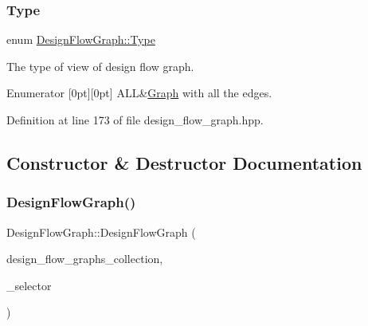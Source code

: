 \subsubsection{\texorpdfstring{Type}{Type}}
{\footnotesize\ttfamily enum \hyperlink{classDesignFlowGraph_ab90f4a312dc3eaa9d6df290bb9b2848b}{Design\+Flow\+Graph\+::\+Type}}



The type of view of design flow graph. 

\begin{DoxyEnumFields}{Enumerator}
[0pt][0pt]{}\mbox{\label{classDesignFlowGraph_ab90f4a312dc3eaa9d6df290bb9b2848bae151085d475a6fe91dbd592fadd70a2b}} 
A\+LL&\hyperlink{structGraph}{Graph} with all the edges. \\
\hline

\end{DoxyEnumFields}


Definition at line 173 of file design\+\_\+flow\+\_\+graph.\+hpp.



\subsection{Constructor \& Destructor Documentation}
\mbox{\label{classDesignFlowGraph_aa3ce6a9558465018fbdd33a5164677fe}} 
\subsubsection{\texorpdfstring{Design\+Flow\+Graph()}{DesignFlowGraph()}}
{\footnotesize\ttfamily Design\+Flow\+Graph\+::\+Design\+Flow\+Graph (\begin{DoxyParamCaption}\item[{const \hyperlink{design__flow__graph_8hpp_abb8645fa685dc5bd944be20162a6d174}{Design\+Flow\+Graphs\+Collection\+Ref}}]{design\+\_\+flow\+\_\+graphs\+\_\+collection,  }\item[{const int}]{\+\_\+selector }\end{DoxyParamCaption})}



